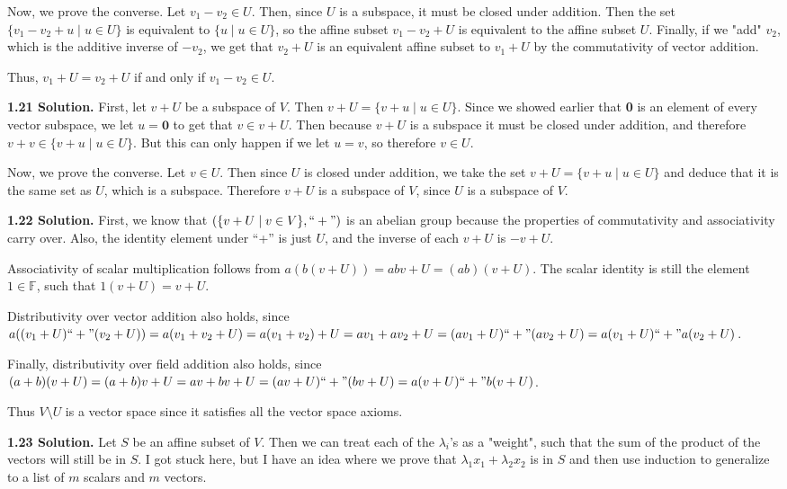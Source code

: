 Now, we prove the converse. Let $v_1-v_2\in U$. Then, since $U$ is a subspace, it must be closed under addition. Then the set $\{v_1-v_2+u\mid u\in U\}$ is equivalent to $\{u\mid u\in U\}$, so the affine subset $v_1-v_2+U$ is equivalent to the affine subset $U$. Finally, if we "add" $v_2$, which is the additive inverse of $-v_2$, we get that $v_2+U$ is an equivalent affine subset to $v_1+U$ by the commutativity of vector addition. 

Thus, $v_1+U=v_2+U$ if and only if $v_1-v_2\in U$.

\textbf{1.21 Solution.} First, let $v+U$ be a subspace of $V$. Then $v+U=\{v+u\mid u\in U\}$. Since we showed earlier that \textbf{0} is an element of every vector subspace, we let $u=\textbf{0}$ to get that $v\in v+U$. Then because $v+U$ is a subspace it must be closed under addition, and therefore $v+v\in\{v+u\mid u\in U\}$. But this can only happen if we let $u=v$, so therefore $v\in U$.

Now, we prove the converse. Let $v\in U$. Then since $U$ is closed under addition, we take the set $v+U=\{v+u\mid u\in U\}$ and deduce that it is the same set as $U$, which is a subspace. Therefore $v+U$ is a subspace of $V$, since $U$ is a subspace of $V$.

\textbf{1.22 Solution.} First, we know that $(\{v+U\mid v\in V\}, ``+")$ is an abelian group because the properties of commutativity and associativity carry over. Also, the identity element under ``+'' is just $U$, and the inverse of each $v+U$ is $-v+U$.

Associativity of scalar multiplication follows from $a(b(v+U))=abv+U=(ab)(v+U)$. The scalar identity is still the element $1\in\mathbb{F}$, such that $1(v+U)=v+U$.

Distributivity over vector addition also holds, since $a((v_1+U)``+"(v_2+U))=a(v_1+v_2+U)=a(v_1+v_2)+U=av_1+av_2+U=(av_1+U)``+"(av_2+U)=a(v_1+U)``+"a(v_2+U)$.

Finally, distributivity over field addition also holds, since $(a+b)(v+U)=(a+b)v+U=av+bv+U=(av+U)``+"(bv+U)=a(v+U)``+"b(v+U)$.

Thus $V\setminus U$ is a vector space since it satisfies all the vector space axioms.

\textbf{1.23 Solution.} Let $S$ be an affine subset of $V$. Then we can treat each of the $\lambda_i$'s as a "weight", such that the sum of the product of the vectors will still be in $S$. I got stuck here, but I have an idea where we prove that $\lambda_1x_1+\lambda_2x_2$ is in $S$ and then use induction to generalize to a list of $m$ scalars and $m$ vectors.

